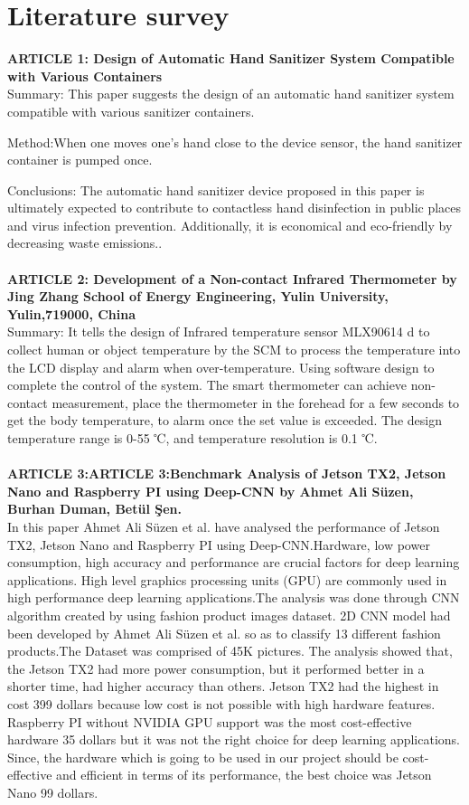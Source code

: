 \chapter{Literature survey}
\noindent 
\textbf{ARTICLE 1: Design of Automatic Hand Sanitizer System
Compatible with Various Containers}\\
Summary:
This paper suggests the design of an automatic hand sanitizer system compatible
with various sanitizer containers.

Method:When one moves one’s hand close to the device sensor, the hand sanitizer container is pumped once.

Conclusions: The automatic hand sanitizer device proposed in this paper is ultimately expected to contribute to contactless
hand disinfection in public places and virus infection prevention. Additionally, it is economical and eco-friendly by decreasing
waste emissions..\\ \\
\textbf{ARTICLE 2: Development of a Non-contact Infrared Thermometer by Jing Zhang
School of Energy Engineering, Yulin University, Yulin,719000, China 
}\\
Summary:
It tells the design of Infrared temperature sensor MLX90614 d to collect human or object temperature by the SCM to process the
temperature into the LCD display and alarm when over-temperature. Using software design to complete the control of the system. The smart thermometer can achieve non-contact measurement,
place the thermometer in the forehead for a few seconds to get the body temperature, to alarm once the set value is exceeded. The design temperature range is 0-55 ℃, and temperature resolution is
0.1 ℃.
 \\ \\
\textbf{ARTICLE 3:ARTICLE 3:Benchmark Analysis of Jetson TX2, Jetson Nano and Raspberry PI using Deep-CNN by Ahmet Ali Süzen, Burhan Duman, Betül Şen.}\\
In this paper Ahmet Ali Süzen et al. have analysed the performance of Jetson TX2, Jetson Nano and Raspberry PI using Deep-CNN.Hardware, low power consumption, high accuracy and performance are crucial factors for deep learning applications.
High level graphics processing units (GPU) are commonly used in high performance deep learning applications.The analysis was done through CNN algorithm created by using fashion product images dataset. 2D CNN model had been developed by Ahmet Ali Süzen et al. so as to classify 13 different fashion products.The Dataset was comprised of 45K pictures. The analysis showed that, the Jetson TX2 had more power consumption, but it performed better in a shorter time, had higher accuracy than others. Jetson TX2 had the highest in cost 399 dollars because low cost is not possible with high hardware features. Raspberry PI without NVIDIA GPU support was the most cost-effective hardware 35 dollars but it was not the right choice for deep learning applications. Since, the hardware which is going to be used in our project should be cost-effective and efficient in terms of its performance, the best choice was Jetson Nano 99 dollars.
